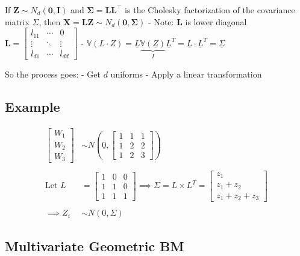 \documentclass[
  oneside]{book}
\begin{document}
If \(\mathbf{Z} \sim N_d(\mathbf{0}, \mathbf{I})\) and \(\boldsymbol{\Sigma}=\mathbf{L L}^{\top}\) is the Cholesky factorization of the covariance matrix \(\Sigma\),
then \(\mathbf{X}=\mathbf{L} \mathbf{Z} \sim N_d(\mathbf{0}, \boldsymbol{\Sigma})\)
- Note: \(\mathbf{L}\) is lower diagonal \(\mathbf{L}=\left[\begin{array}{ccc}l_{11} & \cdots & 0 \\ \vdots & \ddots & \vdots \\ l_{d 1} & \cdots & l_{d d}\end{array}\right]\)
- \(\mathbb{V}(L\cdot Z) = \underline{L} \underbrace{ \mathbb{V}(\underline{Z}) }_{ I }\underline{L}^{T}=\underline{L}\cdot \underline{L}^{T} = \underline{\Sigma}\)

So the process goes:
- Get \(d\) uniforms
- Apply a linear transformation

\hypertarget{example-3}{%
\subsection{Example}\label{example-3}}

\[
\begin{aligned}
\left[ \begin{array}{c}
W_{1} \\
W_{2} \\
W_{3}
\end{array} \right] &\sim N\left(\underline{0}, \left[ \begin{array}{ccc}
1 & 1 & 1 \\
1 & 2 & 2 \\
1 & 2 & 3
\end{array} \right] \right)\\
\\
\text{Let } L &= \left[ \begin{array}{ccc}
1 & 0 & 0 \\
1 & 1 & 0 \\
1 & 1 & 1
\end{array} \right]  \implies \Sigma = L \times L^{T} = \left[ \begin{array}{ccc}
z_{1} \\
z_{1}+z_{2} \\
z_{1}+z_{2}+z_{3}
\end{array} \right]\\
\\
\implies Z_{i} &\sim N(0, \Sigma)
\end{aligned}
\]

\hypertarget{multivariate-geometric-bm}{%
\subsection{Multivariate Geometric BM}\label{multivariate-geometric-bm}}
\end{document}
